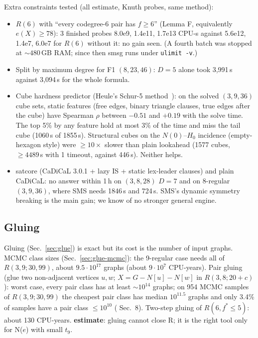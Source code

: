 Extra constraints tested (all estimate, Knuth probes, same method):
\begin{itemize}
\item $R(6)$ with ``every codegree-6 pair has $f \ge 6$'' (Lemma F, equivalently $e(X) \ge 78$): 3 finished probes
  8.0e9, 1.4e11, 1.7e13 CPU-s against 5.6e12, 1.4e7, 6.0e7 for $R(6)$ without it: no gain seen. (A fourth batch was
  stopped at ${\sim}480$\,GB RAM; since then smsg runs under \texttt{ulimit -v}.)
\item Split by maximum degree for F1 $(8,23,46)$: $D = 5$ alone took 3,991\,s against 3,094\,s for the whole formula.
\item Cube hardness predictor (Heule's Schur-5 method~\cite{Heule18}): on the solved $(3,9,36)$ cube sets, static features (free edges,
  binary triangle clauses, true edges after the cube) have Spearman $\rho$ between $-0.51$ and $+0.19$ with the solve time.
  The top 5\% by any feature hold at most 3\% of the time and miss the tail cube (1060\,s of 1855\,s).
  Structural cubes on the $N(0)$--$H_0$ incidence (empty-hexagon style) were $\ge 10\times$ slower
  than plain lookahead (1577 cubes, $\ge 4489$\,s with 1 timeout, against 446\,s). Neither helps.
\item satcore (CaDiCaL 3.0.1 + lazy IS + static lex-leader clauses) and plain CaDiCaL: no answer within 1\,h on
  $(3,8,28)$ $D = 7$ and on 8-regular $(3,9,36)$, where SMS needs 1846\,s and 724\,s. SMS's dynamic symmetry breaking
  is the main gain; we know of no stronger general engine.
\end{itemize}

\subsection{Gluing}\label{sec:hard-glue}
Gluing (Sec.~\ref{sec:glue}) is exact but its cost is the number of input graphs. MCMC class sizes (Sec.~\ref{sec:glue-mcmc}): the
9-regular case needs all of $R(3,9;30,99)$, about $9.5\cdot 10^{17}$ graphs (about $9\cdot 10^{7}$ CPU-years). Pair gluing (glue two
non-adjacent vertices $u, w$; $X = G - N[u] - N[w]$ in $R(3,8;20+c)$): worst case, every pair class has at least
${\sim}10^{14}$ graphs; on 954 MCMC samples of $R(3,9;30,99)$ the cheapest pair class has median $10^{11.5}$ graphs and only 3.4\%
of samples have a pair class $\le 10^{10}$ ( Sec.~8). Two-step gluing of $R(6, f^* \le 5)$: about
130 CPU-years. \textbf{estimate}: gluing cannot close R; it is the right tool only for N($e$) with small $t_9$.

